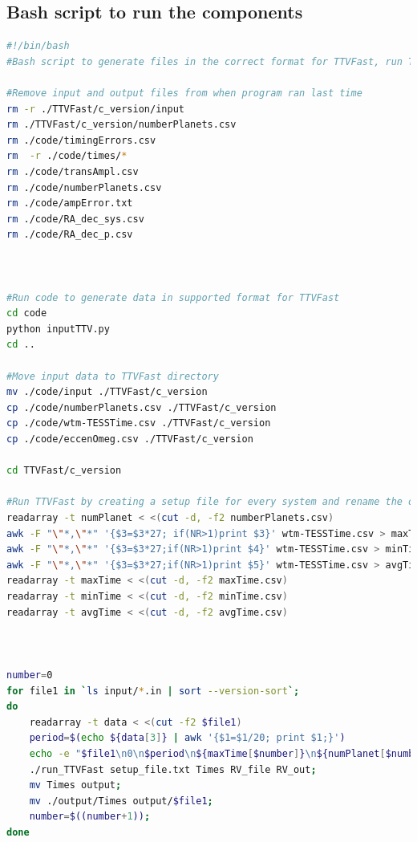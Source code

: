 \documentclass[12pt]{report}
\newcommand{\mnras}{MNRAS}
\newcommand{\aap}{A\&A}
\begin{document}
%



\iffalse
\begin{appendix}

\chapter{Bash script to run the components}
\begin{lstlisting}[language=Bash]
#!/bin/bash
#Bash script to generate files in the correct format for TTVFast, run TTVFast and plot the results

#Remove input and output files from when program ran last time
rm -r ./TTVFast/c_version/input
rm ./TTVFast/c_version/numberPlanets.csv
rm ./code/timingErrors.csv
rm  -r ./code/times/*
rm ./code/transAmpl.csv
rm ./code/numberPlanets.csv
rm ./code/ampError.txt
rm ./code/RA_dec_sys.csv
rm ./code/RA_dec_p.csv



#Run code to generate data in supported format for TTVFast
cd code
python inputTTV.py
cd ..

#Move input data to TTVFast directory
mv ./code/input ./TTVFast/c_version
cp ./code/numberPlanets.csv ./TTVFast/c_version
cp ./code/wtm-TESSTime.csv ./TTVFast/c_version
cp ./code/eccenOmeg.csv ./TTVFast/c_version

cd TTVFast/c_version

#Run TTVFast by creating a setup file for every system and rename the output file to the number of the system
readarray -t numPlanet < <(cut -d, -f2 numberPlanets.csv)
awk -F "\"*,\"*" '{$3=$3*27; if(NR>1)print $3}' wtm-TESSTime.csv > maxTime.csv
awk -F "\"*,\"*" '{$3=$3*27;if(NR>1)print $4}' wtm-TESSTime.csv > minTime.csv
awk -F "\"*,\"*" '{$3=$3*27;if(NR>1)print $5}' wtm-TESSTime.csv > avgTime.csv
readarray -t maxTime < <(cut -d, -f2 maxTime.csv)
readarray -t minTime < <(cut -d, -f2 minTime.csv)
readarray -t avgTime < <(cut -d, -f2 avgTime.csv)



number=0
for file1 in `ls input/*.in | sort --version-sort`;
do
	readarray -t data < <(cut -f2 $file1)
	period=$(echo ${data[3]} | awk '{$1=$1/20; print $1;}')
	echo -e "$file1\n0\n$period\n${maxTime[$number]}\n${numPlanet[$number]}\n0" > setup_file.txt;  		
	./run_TTVFast setup_file.txt Times RV_file RV_out;
	mv Times output;
	mv ./output/Times output/$file1;
	number=$((number+1));
done


\end{lstlisting}
\end{appendix}
\end{document}
